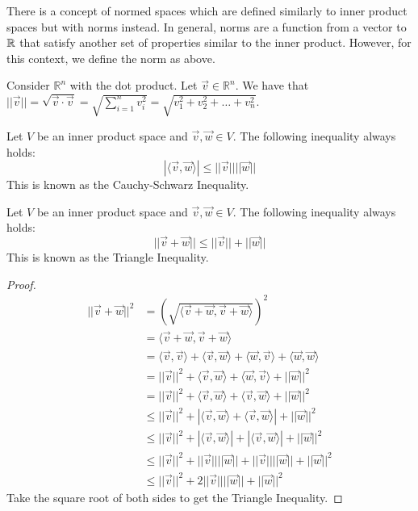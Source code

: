 \begin{remark}
    There is a concept of normed spaces which are defined similarly to inner product spaces but with norms instead. In general, norms are a function from a vector to $\mathbb{R}$ that satisfy another set of properties similar to the inner product. However, for this context, we define the norm as above.
\end{remark}
\begin{example}
    Consider $\mathbb{R}^n$ with the dot product. Let $\vec{v}\in\mathbb{R}^n$. We have that $||\vec{v}||=\sqrt{\vec{v}\cdot\vec{v}}=\sqrt{\sum_{i=1}^n v_i^2}=\sqrt{v_1^2+v_2^2+\ldots+v_n^2}$.
\end{example}
\begin{theorem}
    Let $V$ be an inner product space and $\vec{v},\vec{w}\in V$. The following inequality always holds:
    $$|\langle\vec{v},\vec{w}\rangle|\leq||\vec{v}||||\vec{w}||$$
    This is known as the Cauchy-Schwarz Inequality.
\end{theorem}
\begin{theorem}
    Let $V$ be an inner product space and $\vec{v},\vec{w}\in V$. The following inequality always holds:
    $$||\vec{v}+\vec{w}||\leq||\vec{v}||+||\vec{w}||$$
    This is known as the Triangle Inequality.
\end{theorem}
\begin{proof}
    \begin{align*}
        ||\vec{v}+\vec{w}||^2&=(\sqrt{\langle\vec{v}+\vec{w},\vec{v}+\vec{w}\rangle})^2\\
        &=\langle\vec{v}+\vec{w},\vec{v}+\vec{w}\rangle\\
        &=\langle\vec{v},\vec{v}\rangle+\langle\vec{v},\vec{w}\rangle+\langle\vec{w},\vec{v}\rangle+\langle\vec{w},\vec{w}\rangle\tag{by Linearity of Inner Product}\\
        &=||\vec{v}||^2+\langle\vec{v},\vec{w}\rangle+\langle\vec{w},\vec{v}\rangle+||\vec{w}||^2\\
        &=||\vec{v}||^2+\langle\vec{v},\vec{w}\rangle+\langle\vec{v},\vec{w}\rangle+||\vec{w}||^2\tag{by Symmetry of Inner Product}\\
        &\leq||\vec{v}||^2+|\langle\vec{v},\vec{w}\rangle+\langle\vec{v},\vec{w}\rangle|+||\vec{w}||^2\\
        &\leq||\vec{v}||^2+|\langle\vec{v},\vec{w}\rangle|+|\langle\vec{v},\vec{w}\rangle|+||\vec{w}||^2\\
        &\leq||\vec{v}||^2+||\vec{v}||||\vec{w}||+||\vec{v}||||\vec{w}||+||\vec{w}||^2\tag{by Cauchy Schwarz Inequality}\\
        &\leq||\vec{v}||^2+2||\vec{v}||||\vec{w}||+||\vec{w}||^2
    \end{align*}
    Take the square root of both sides to get the Triangle Inequality.
\end{proof}
